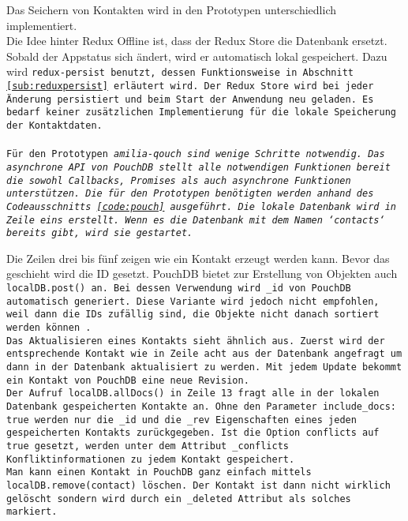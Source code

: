Das Seichern von Kontakten wird in den Prototypen unterschiedlich implementiert.\\
Die Idee hinter Redux Offline ist, dass der Redux Store die Datenbank ersetzt. Sobald der Appstatus sich ändert, wird er automatisch lokal gespeichert. Dazu wird \tt{redux-persist} benutzt, dessen Funktionsweise in Abschnitt \ref{sub:reduxpersist} erläutert wird. Der Redux Store wird bei jeder Änderung persistiert und beim Start der Anwendung neu geladen. Es bedarf keiner zusätzlichen Implementierung für die lokale Speicherung der Kontaktdaten.\\\\
Für den Prototypen \it{amilia-qouch} sind wenige Schritte notwendig. Das asynchrone \gls{API} von PouchDB stellt alle notwendigen Funktionen bereit die sowohl Callbacks, Promises als auch asynchrone Funktionen unterstützen. Die für den Prototypen benötigten werden anhand des Codeausschnitts \ref{code:pouch} ausgeführt.
Die lokale Datenbank wird in Zeile eins erstellt. Wenn es die Datenbank mit dem Namen `contacts` bereits gibt, wird sie gestartet.
%
\begin{center}
  
\end{center}
%
Die Zeilen drei bis fünf zeigen wie ein Kontakt erzeugt werden kann. Bevor das geschieht wird die ID gesetzt. PouchDB bietet zur Erstellung von Objekten auch \tt{localDB.post()} an. Bei dessen Verwendung wird \tt{\_id} von PouchDB automatisch generiert. Diese Variante wird jedoch nicht empfohlen, weil dann die IDs zufällig sind, die Objekte nicht danach sortiert werden können~\cite{pouch-create}.\\
Das Aktualisieren eines Kontakts sieht ähnlich aus. Zuerst wird der entsprechende Kontakt wie in Zeile acht aus der Datenbank angefragt um dann in der Datenbank aktualisiert zu werden. Mit jedem Update bekommt ein Kontakt von PouchDB eine neue Revision.\\
Der Aufruf \tt{localDB.allDocs()} in Zeile 13 fragt alle in der lokalen Datenbank gespeicherten Kontakte an. Ohne den Parameter \tt{include\_docs: true} werden nur die \tt{\_id} und die \tt{\_rev} Eigenschaften eines jeden gespeicherten Kontakts zurückgegeben. Ist die Option \tt{conflicts} auf \tt{true} gesetzt, werden unter dem Attribut \tt{\_conflicts} Konfliktinformationen zu jedem Kontakt gespeichert.\\
Man kann einen Kontakt in PouchDB ganz einfach mittels \tt{localDB.remove(contact)} löschen. Der Kontakt ist dann nicht wirklich gelöscht sondern wird durch ein \tt{_deleted} Attribut als solches markiert.
